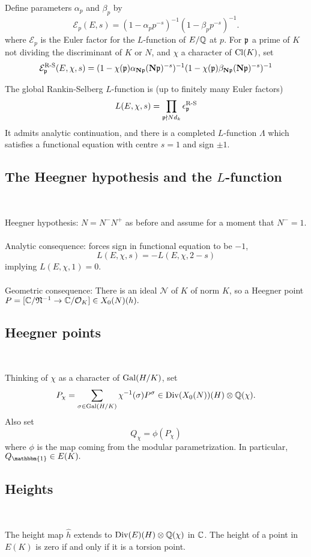 \documentclass[12pt,amsfont]{amsart}
\begin{document}
Define parameters $\alpha_p$ and $\beta_p$ by
\[\mathcal{E}_p(E,s) = (1 - \alpha_p p^{-s})^{-1} (1 - \beta_p p^{-s})^{-1}.\]
where $\mathcal{E}_p$ is the Euler factor for the $L$-function of $E/{\mathbb Q}$ at $p$. For $\mathfrak{p}$ a prime of $K$ not dividing the discriminant of $K$ or $N$, and $\chi$ a character of $\operatorname{Cl}(K)$, set
\[\mathcal{E}_{\mathfrak{p}}^{\text{R-S}} (E, \chi, s) = (1 - \chi(\mathfrak{p}) \alpha_{\textbf{N}\mathfrak{p}}(\textbf{N}\mathfrak{p})^{-s})^{-1} (1 - \chi(\mathfrak{p}) \beta_{\textbf{N}\mathfrak{p}} (\textbf{N} \mathfrak{p})^{-s})^{-1} \]

The global Rankin-Selberg $L$-function is (up to finitely many Euler factors)
\[L(E, \chi, s) = \prod_{\mathfrak{p} \nmid Nd_k} \epsilon_{\mathfrak{p}}^{\text{R-S}} \]
It admits analytic continuation, and there is a completed $L$-function $\Lambda$ which satisfies a functional equation with centre $s=1$ and sign $\pm 1$.

\subsection{The Heegner hypothesis and the $L$-function} 
{\ }

Heegner hypothesis: $N = N^{-} N^+$ as before and assume for a moment that $N^{-} = 1$. \\ \\
Analytic consequence: forces sign in functional equation to be $-1$, 
\[L(E,\chi,s) = -L(E, \chi, 2-s)\]
implying $L(E, \chi, 1) = 0$. \\ \\
Geometric consequence: There is an ideal $\mathcal{N}$ of $K$ of norm $K$, so a Heegner point $P = [{\mathbb C} / \mathfrak{N}^{-1} \rightarrow {\mathbb C}/\mathcal{O}_K] \in X_0(N)(h).$


\subsection{Heegner points}
{\ }

Thinking of $\chi$ as a character of $\operatorname{Gal}(H/K)$, set
\[P_\chi = \sum_{\sigma \in \operatorname{Gal}(H/K)} \chi^{-1}(\sigma) P^\sigma \in \operatorname{Div}(X_0(N))(H) \otimes {\mathbb Q}(\chi).\]
Also set
\[Q_\chi = \phi(P_\chi)\]
where $\phi$ is the map coming from the modular parametrization. In particular, $Q_{\mathbbm{1}} \in E(K).$ 


\subsection{Heights}
{\ }

The height map $\widehat{h}$ extends to $\operatorname{Div}(E)(H) \otimes {\mathbb Q}(\chi)$ in ${\mathbb C}$. The height of a point in $E(K)$ is zero if and only if it is a torsion point. 
\end{document}
